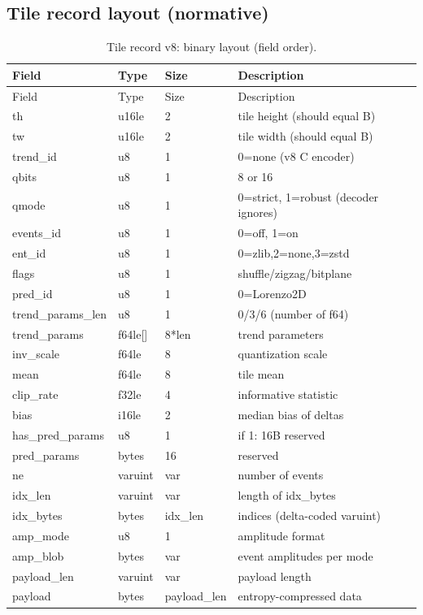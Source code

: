 \documentclass[11pt,a4paper]{article}
\begin{document}
\subsection{Tile record layout (normative)}
\begin{longtable}{@{}llll@{}}
\caption{Tile record v8: binary layout (field order).}
\label{tab:tile_layout}\\
\toprule
Field & Type & Size & Description \\
\midrule
\endfirsthead
\toprule
Field & Type & Size & Description \\
\midrule
\endhead
\bottomrule
\endfoot

th & u16le & 2 & tile height (should equal B) \\
tw & u16le & 2 & tile width (should equal B) \\
trend\_id & u8 & 1 & 0=none (v8 C encoder) \\
qbits & u8 & 1 & 8 or 16 \\
qmode & u8 & 1 & 0=strict, 1=robust (decoder ignores) \\
events\_id & u8 & 1 & 0=off, 1=on \\
ent\_id & u8 & 1 & 0=zlib,2=none,3=zstd \\
flags & u8 & 1 & shuffle/zigzag/bitplane \\
pred\_id & u8 & 1 & 0=Lorenzo2D \\
trend\_params\_len & u8 & 1 & 0/3/6 (number of f64) \\
trend\_params & f64le[] & 8*len & trend parameters \\
inv\_scale & f64le & 8 & quantization scale \\
mean & f64le & 8 & tile mean \\
clip\_rate & f32le & 4 & informative statistic \\
bias & i16le & 2 & median bias of deltas \\
has\_pred\_params & u8 & 1 & if 1: 16B reserved \\
pred\_params & bytes & 16 & reserved \\
ne & varuint & var & number of events \\
idx\_len & varuint & var & length of idx\_bytes \\
idx\_bytes & bytes & idx\_len & indices (delta-coded varuint) \\
amp\_mode & u8 & 1 & amplitude format \\
amp\_blob & bytes & var & event amplitudes per mode \\
payload\_len & varuint & var & payload length \\
payload & bytes & payload\_len & entropy-compressed data \\
\end{longtable}
\end{document}
